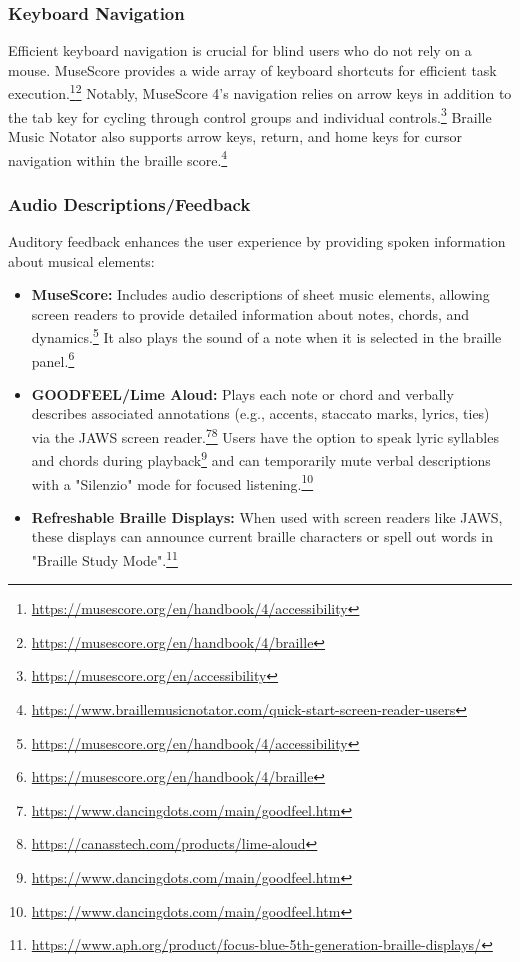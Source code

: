 \subsubsection{Keyboard Navigation}
Efficient keyboard navigation is crucial for blind users who do not rely on a mouse. MuseScore provides a wide array of keyboard shortcuts for efficient task execution.\footnote{\url{https://musescore.org/en/handbook/4/accessibility}}\footnote{\url{https://musescore.org/en/handbook/4/braille}} Notably, MuseScore 4's navigation relies on arrow keys in addition to the tab key for cycling through control groups and individual controls.\footnote{\url{https://musescore.org/en/accessibility}} Braille Music Notator also supports arrow keys, return, and home keys for cursor navigation within the braille score.\footnote{\url{https://www.braillemusicnotator.com/quick-start-screen-reader-users}}

\subsubsection{Audio Descriptions/Feedback}
Auditory feedback enhances the user experience by providing spoken information about musical elements:
\begin{itemize}
    \item \textbf{MuseScore:} Includes audio descriptions of sheet music elements, allowing screen readers to provide detailed information about notes, chords, and dynamics.\footnote{\url{https://musescore.org/en/handbook/4/accessibility}} It also plays the sound of a note when it is selected in the braille panel.\footnote{\url{https://musescore.org/en/handbook/4/braille}}
    \item \textbf{GOODFEEL/Lime Aloud:} Plays each note or chord and verbally describes associated annotations (e.g., accents, staccato marks, lyrics, ties) via the JAWS screen reader.\footnote{\url{https://www.dancingdots.com/main/goodfeel.htm}}\footnote{\url{https://canasstech.com/products/lime-aloud}} Users have the option to speak lyric syllables and chords during playback\footnote{\url{https://www.dancingdots.com/main/goodfeel.htm}} and can temporarily mute verbal descriptions with a "Silenzio" mode for focused listening.\footnote{\url{https://www.dancingdots.com/main/goodfeel.htm}}
    \item \textbf{Refreshable Braille Displays:} When used with screen readers like JAWS, these displays can announce current braille characters or spell out words in "Braille Study Mode".\footnote{\url{https://www.aph.org/product/focus-blue-5th-generation-braille-displays/}}
\end{itemize}


